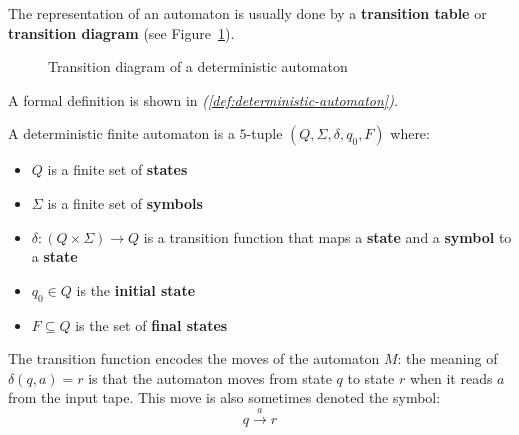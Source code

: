 \documentclass[english]{article}
\begin{document}
\bigskip
The representation of an automaton is usually done by a \textbf{transition table} or \textbf{transition diagram} (see Figure~\ref{fig:transition-diagram}).

\begin{figure}[htbp]
  \centering
  \bigskip
  \bigskip
  \caption{Transition diagram of a deterministic automaton}
  \label{fig:transition-diagram}
\end{figure}

A formal definition is shown in \textit{(\ref{def:deterministic-automaton})}.

\begin{definition}
  \label{def:deterministic-automaton}

  A deterministic finite automaton is a \(5\)-tuple \((Q, \Sigma, \delta, q_0, F)\) where:

  \begin{itemize}
    \item \(Q\) is a finite set of \textbf{states}
    \item \(\Sigma\) is a finite set of \textbf{symbols}
    \item \(\delta: \left( Q \times \Sigma \right) \rightarrow Q\) is a transition function that maps a \textbf{state} and a \textbf{symbol} to a \textbf{state}
    \item \(q_0 \in Q\) is the\textbf{ initial state}
    \item \(F \subseteq Q\) is the set of \textbf{final states}
  \end{itemize}
\end{definition}

The transition function encodes the moves of the automaton \(M\): the meaning of \(\delta(q, a) = r\) is that the automaton moves from state \(q\) to state \(r\) when it reads \(a\) from the input tape.
This move is also sometimes denoted the symbol: \[q \xrightarrow{a} r\]
\end{document}
